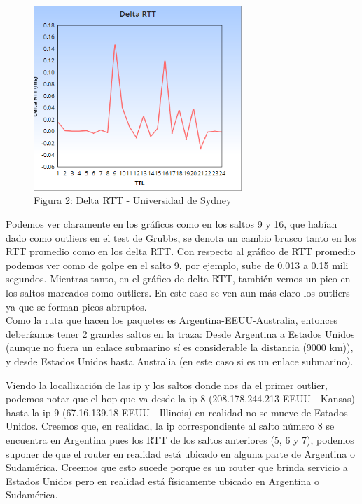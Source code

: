 \begin{figure}[h]
	\begin{center}
    \includegraphics[width=0.7\textwidth]{img_analisis2/Delta_RTT.png}
     \caption{Figura 2: Delta RTT - Universidad de Sydney} 
	\end{center} 
    
\end{figure}
\vspace{0.25cm}


Podemos ver claramente en los gr\'aficos como en los saltos 9 y 16, que hab\'ian dado como outliers en el test de Grubbs, se denota un cambio brusco tanto en los RTT promedio como en los delta RTT. Con respecto al gr\'afico de RTT promedio podemos ver como de golpe en el salto 9, por ejemplo, sube de 0.013 a 0.15 mili segundos. Mientras tanto, en el gr\'afico de delta RTT, tambi\'en vemos un pico en los saltos marcados como outliers. En este caso se ven aun m\'as claro los outliers ya que se forman picos abruptos.\\
Como la ruta que hacen los paquetes es Argentina-EEUU-Australia, entonces deber\'iamos tener 2 grandes saltos en la traza: Desde Argentina a Estados Unidos (aunque no fuera un enlace submarino s\'i es considerable la distancia (9000 km)), y desde Estados Unidos hasta Australia (en este caso si es un enlace submarino). \newline

Viendo la locallizaci\'on de las ip y los saltos donde nos da el primer outlier, podemos notar que el hop que va desde la  ip 8 (208.178.244.213  EEUU - Kansas) hasta la ip 9 (67.16.139.18     EEUU - Illinois) en realidad no se mueve de Estados Unidos. Creemos que, en realidad, la ip correspondiente al salto n\'umero 8 se encuentra en Argentina pues los RTT de los saltos anteriores (5, 6 y 7), podemos suponer de que el router en realidad est\'a ubicado en alguna parte de Argentina o Sudam\'erica. Creemos que esto sucede porque es un router que brinda servicio a Estados Unidos pero en realidad est\'a f\'isicamente ubicado en Argentina o Sudam\'erica.  \newline

